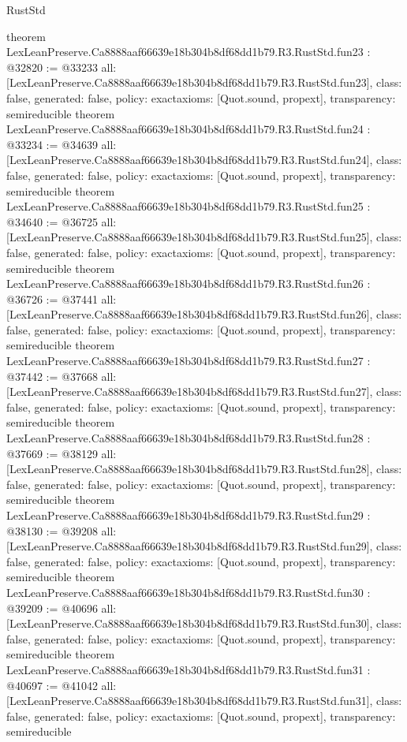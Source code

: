 \begin{lexlean}{RustStd}
\begin{coremodule}
{}
theorem LexLeanPreserve.Ca8888aaf66639e18b304b8df68dd1b79.R3.RustStd.fun23 : @32820 := @33233 {
  all: [LexLeanPreserve.Ca8888aaf66639e18b304b8df68dd1b79.R3.RustStd.fun23],
  class: false,
  generated: false,
  policy: exact{axioms: [Quot.sound, propext]},
  transparency: semireducible
}
theorem LexLeanPreserve.Ca8888aaf66639e18b304b8df68dd1b79.R3.RustStd.fun24 : @33234 := @34639 {
  all: [LexLeanPreserve.Ca8888aaf66639e18b304b8df68dd1b79.R3.RustStd.fun24],
  class: false,
  generated: false,
  policy: exact{axioms: [Quot.sound, propext]},
  transparency: semireducible
}
theorem LexLeanPreserve.Ca8888aaf66639e18b304b8df68dd1b79.R3.RustStd.fun25 : @34640 := @36725 {
  all: [LexLeanPreserve.Ca8888aaf66639e18b304b8df68dd1b79.R3.RustStd.fun25],
  class: false,
  generated: false,
  policy: exact{axioms: [Quot.sound, propext]},
  transparency: semireducible
}
theorem LexLeanPreserve.Ca8888aaf66639e18b304b8df68dd1b79.R3.RustStd.fun26 : @36726 := @37441 {
  all: [LexLeanPreserve.Ca8888aaf66639e18b304b8df68dd1b79.R3.RustStd.fun26],
  class: false,
  generated: false,
  policy: exact{axioms: [Quot.sound, propext]},
  transparency: semireducible
}
theorem LexLeanPreserve.Ca8888aaf66639e18b304b8df68dd1b79.R3.RustStd.fun27 : @37442 := @37668 {
  all: [LexLeanPreserve.Ca8888aaf66639e18b304b8df68dd1b79.R3.RustStd.fun27],
  class: false,
  generated: false,
  policy: exact{axioms: [Quot.sound, propext]},
  transparency: semireducible
}
theorem LexLeanPreserve.Ca8888aaf66639e18b304b8df68dd1b79.R3.RustStd.fun28 : @37669 := @38129 {
  all: [LexLeanPreserve.Ca8888aaf66639e18b304b8df68dd1b79.R3.RustStd.fun28],
  class: false,
  generated: false,
  policy: exact{axioms: [Quot.sound, propext]},
  transparency: semireducible
}
theorem LexLeanPreserve.Ca8888aaf66639e18b304b8df68dd1b79.R3.RustStd.fun29 : @38130 := @39208 {
  all: [LexLeanPreserve.Ca8888aaf66639e18b304b8df68dd1b79.R3.RustStd.fun29],
  class: false,
  generated: false,
  policy: exact{axioms: [Quot.sound, propext]},
  transparency: semireducible
}
theorem LexLeanPreserve.Ca8888aaf66639e18b304b8df68dd1b79.R3.RustStd.fun30 : @39209 := @40696 {
  all: [LexLeanPreserve.Ca8888aaf66639e18b304b8df68dd1b79.R3.RustStd.fun30],
  class: false,
  generated: false,
  policy: exact{axioms: [Quot.sound, propext]},
  transparency: semireducible
}
theorem LexLeanPreserve.Ca8888aaf66639e18b304b8df68dd1b79.R3.RustStd.fun31 : @40697 := @41042 {
  all: [LexLeanPreserve.Ca8888aaf66639e18b304b8df68dd1b79.R3.RustStd.fun31],
  class: false,
  generated: false,
  policy: exact{axioms: [Quot.sound, propext]},
  transparency: semireducible
}
\end{coremodule}
\end{lexlean}
